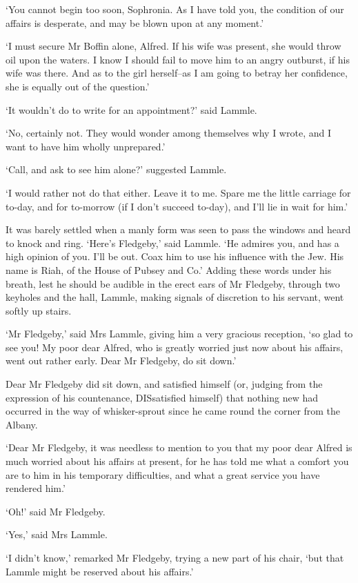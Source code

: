 ‘You cannot begin too soon, Sophronia. As I have told you, the condition
of our affairs is desperate, and may be blown upon at any moment.’

‘I must secure Mr Boffin alone, Alfred. If his wife was present, she
would throw oil upon the waters. I know I should fail to move him to an
angry outburst, if his wife was there. And as to the girl herself--as I
am going to betray her confidence, she is equally out of the question.’

‘It wouldn’t do to write for an appointment?’ said Lammle.

‘No, certainly not. They would wonder among themselves why I wrote, and
I want to have him wholly unprepared.’

‘Call, and ask to see him alone?’ suggested Lammle.

‘I would rather not do that either. Leave it to me. Spare me the little
carriage for to-day, and for to-morrow (if I don’t succeed to-day), and
I’ll lie in wait for him.’

It was barely settled when a manly form was seen to pass the windows
and heard to knock and ring. ‘Here’s Fledgeby,’ said Lammle. ‘He admires
you, and has a high opinion of you. I’ll be out. Coax him to use his
influence with the Jew. His name is Riah, of the House of Pubsey and
Co.’ Adding these words under his breath, lest he should be audible
in the erect ears of Mr Fledgeby, through two keyholes and the hall,
Lammle, making signals of discretion to his servant, went softly up
stairs.

‘Mr Fledgeby,’ said Mrs Lammle, giving him a very gracious reception,
‘so glad to see you! My poor dear Alfred, who is greatly worried just
now about his affairs, went out rather early. Dear Mr Fledgeby, do sit
down.’

Dear Mr Fledgeby did sit down, and satisfied himself (or, judging from
the expression of his countenance, DISsatisfied himself) that nothing
new had occurred in the way of whisker-sprout since he came round the
corner from the Albany.

‘Dear Mr Fledgeby, it was needless to mention to you that my poor dear
Alfred is much worried about his affairs at present, for he has told me
what a comfort you are to him in his temporary difficulties, and what a
great service you have rendered him.’

‘Oh!’ said Mr Fledgeby.

‘Yes,’ said Mrs Lammle.

‘I didn’t know,’ remarked Mr Fledgeby, trying a new part of his chair,
‘but that Lammle might be reserved about his affairs.’

